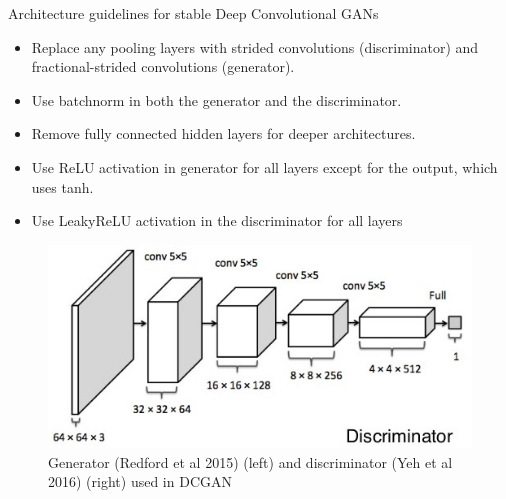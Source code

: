 \begin{frame}
	Architecture guidelines for stable Deep Convolutional GANs
	\begin{itemize}
		\item Replace any pooling layers with strided convolutions (discriminator) and fractional-strided convolutions (generator).
		\item Use batchnorm in both the generator and the discriminator.
		\item Remove fully connected hidden layers for deeper architectures.
		\item Use ReLU activation in generator for all layers except for the output, which uses tanh.
		\item Use LeakyReLU activation in the discriminator for all layers
	\end{itemize}
    \begin{figure}
        \includegraphics[scale=0.32]{images/dcgan_disc.jpg}
        \caption{Generator (Redford et al 2015) (left) and discriminator (Yeh et al 2016) (right) used in DCGAN}
    \end{figure}
\end{frame}

